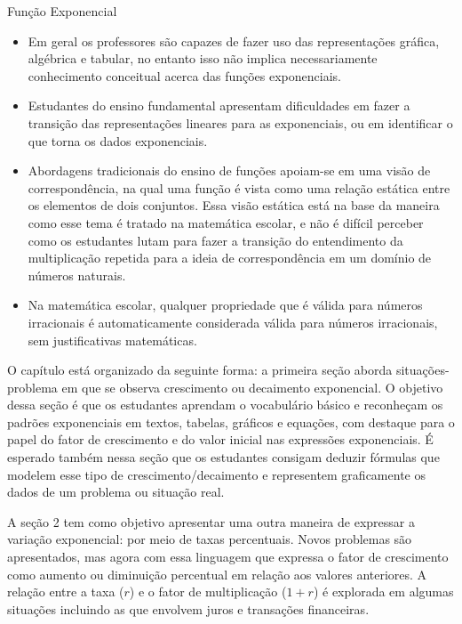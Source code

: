 \begin{apresentacao}{Função Exponencial}
\begin{itemize}
\item Em geral os professores são capazes de fazer uso das representações gráfica, algébrica e tabular, no entanto isso não implica necessariamente conhecimento conceitual acerca das funções exponenciais. \citep{Presmeg2005}

\item Estudantes do ensino fundamental apresentam dificuldades em fazer a transição das representações lineares para as exponenciais, ou em identificar o que torna os dados exponenciais. \citep{Alagic2006}

\item Abordagens tradicionais do ensino de funções apoiam-se em uma visão de correspondência, na qual uma função é vista como uma relação estática entre os elementos de dois conjuntos. Essa visão estática está na base da maneira como esse tema é tratado na matemática escolar, e não é difícil perceber como os estudantes lutam para fazer a transição do entendimento da multiplicação repetida para a ideia de correspondência em um domínio de números naturais. \citep{Ellis2012}

\item Na matemática escolar, qualquer propriedade que é válida para números irracionais é automaticamente considerada válida para números irracionais, sem justificativas matemáticas. \citep{Wu2011}

\end{itemize}

O capítulo está organizado da seguinte forma: a primeira seção aborda situações-problema em que se observa crescimento ou decaimento exponencial. O objetivo dessa seção é que os estudantes aprendam o vocabulário básico e reconheçam os padrões exponenciais em textos, tabelas, gráficos e equações, com destaque para o papel do fator de crescimento e do valor inicial nas expressões exponenciais. É esperado também nessa seção que os estudantes consigam deduzir fórmulas que modelem esse tipo de crescimento/decaimento e representem graficamente os dados de um problema ou situação real.

A seção 2 tem como objetivo apresentar uma outra maneira de expressar a variação exponencial: por meio de taxas percentuais. Novos problemas são apresentados, mas agora com essa linguagem que expressa o fator de crescimento como aumento ou diminuição percentual em relação aos valores anteriores. A relação entre a taxa ($r$) e o fator de multiplicação ($1+r$) é explorada em algumas situações incluindo as que envolvem juros e transações financeiras.


\end{apresentacao}
